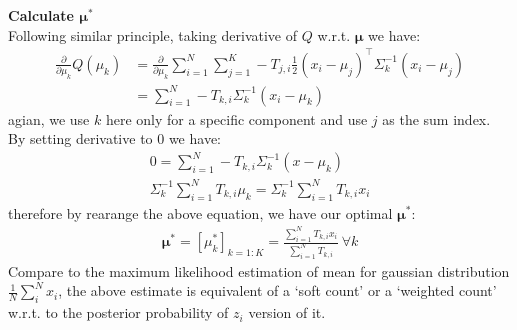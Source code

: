 \documentclass{article} [10pt] %
\newcommand{\bs}{\boldsymbol}
\begin{document}
\textbf{Calculate $\bs\mu^*$}\\
Following similar principle, taking derivative of $Q$ w.r.t. $\bs\mu$ we have:
\begin{align}
	\frac{\partial }{\partial \mu_k} Q(\mu_k) &=\frac{\partial }{\partial \mu_k} \sum_{i=1}^N \sum_{j=1}^K 
	-T_{j, i}\frac{1}{2}(x_i-\mu_j)^\top\Sigma_k^{-1}(x_i-\mu_j)\\
	&=\sum_{i=1}^N -T_{k, i}\Sigma_k^{-1}(x_i-\mu_k)
\end{align}
agian, we use $k$ here only for a specific component and use $j$ as the sum index. By setting derivative to 0 we have:
\begin{align}
	0=\sum_{i=1}^N -T_{k, i}\Sigma_k^{-1}(x-\mu_k)\\
	 \Sigma_k^{-1}\sum_{i=1}^N  T_{k, i} \mu_k =\Sigma_k^{-1}\sum_{i=1}^NT_{k, i}x_i
\end{align}
therefore by rearange the above equation, we have our optimal $\bs\mu^*$:
\begin{align} \label{eq:optimal_mu}
\boxed{
	\bs\mu^*=[\mu_k^*]_{k=1:K} = \frac{\sum_{i=1}^NT_{k, i}x_i}{\sum_{i=1}^N  T_{k, i}} \ \forall k
}
\end{align}
Compare to the maximum likelihood estimation of mean for gaussian distribution $\frac{1}{N}\sum_i^Nx_i$, the above estimate is equivalent of a `soft count' or a `weighted count' w.r.t. to the posterior probability of $z_i$ version of it.
\end{document}
